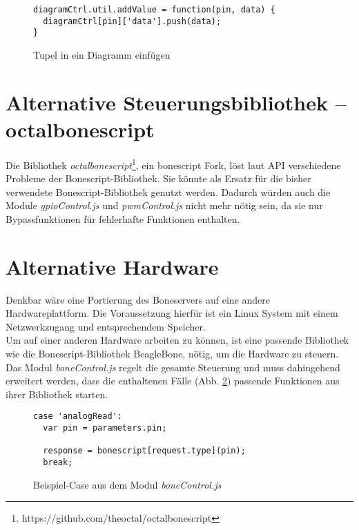 \documentclass[thesis.tex]{subfiles}
\begin{document}
\begin{figure}[H]
\begin{lstlisting}
diagramCtrl.util.addValue = function(pin, data) {
  diagramCtrl[pin]['data'].push(data);
}
\end{lstlisting}
\caption{Tupel in ein Diagramm einfügen}
\label{lst:insertTupel}
\end{figure}


\section{Alternative Steuerungsbibliothek -- octalbonescript}
Die Bibliothek \textit{octalbonescript}\footnote{https://github.com/theoctal/octalbonescript}, ein bonescript Fork, löst laut API verschiedene Probleme der Bonescript-Bibliothek. Sie könnte als Ersatz für die bisher verwendete Bonescript-Bibliothek genutzt werden. Dadurch würden auch die Module \textit{gpioControl.js} und \textit{pwmControl.js} nicht mehr nötig sein, da sie nur Bypassfunktionen für fehlerhafte Funktionen enthalten.


\section{Alternative Hardware}
Denkbar wäre eine Portierung des Boneservers auf eine andere Hardwareplattform. Die Voraussetzung hierfür ist ein Linux System mit einem Netzwerkzugang und entsprechendem Speicher.\\

Um auf einer anderen Hardware arbeiten zu können, ist eine passende Bibliothek wie die Bonescript-Bibliothek BeagleBone, nötig, um die Hardware zu steuern. Das Modul \textit{boneControl.js} regelt die gesamte Steuerung und muss dahingehend erweitert werden, dass die enthaltenen Fälle (Abb. \ref{lst:exampleCase}) passende Funktionen aus ihrer Bibliothek starten.

\begin{figure}[H]
\begin{lstlisting}
case 'analogRead':
  var pin = parameters.pin;

  response = bonescript[request.type](pin);
  break;
\end{lstlisting}
\caption{Beispiel-Case aus dem Modul \textit{boneControl.js}}
\label{lst:exampleCase}
\end{figure}
\end{document}
